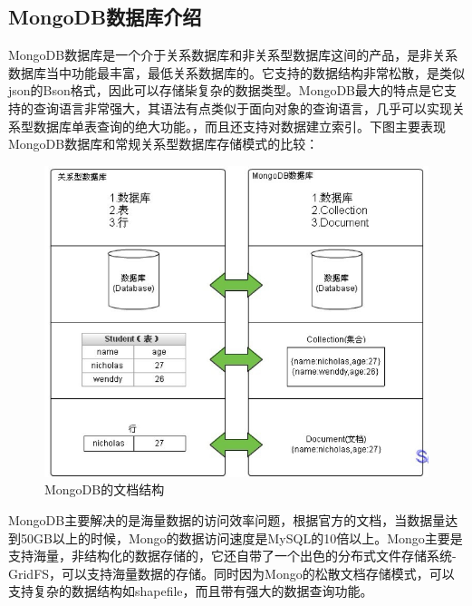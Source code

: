 \documentclass[master]{njnuthesis}
\begin{document}
\subsection{MongoDB数据库介绍}
MongoDB数据库是一个介于关系数据库和非关系型数据库这间的产品，是非关系数据库当中功能最丰富，最低关系数据库的。它支持的数据结构非常松散，是类似json的Bson格式，因此可以存储枈复杂的数据类型。MongoDB最大的特点是它支持的查询语言非常强大，其语法有点类似于面向对象的查询语言，几乎可以实现关系型数据库单表查询的绝大功能。，而且还支持对数据建立索引。下图主要表现MongoDB数据库和常规关系型数据库存储模式的比较：


\begin{figure}[!htb]
\begin{center}
\includegraphics[angle=0,width=1\textwidth]{pic//mongoDB_fileType.jpg}
\caption{MongoDB的文档结构}
\label{fig:1}
\end{center}
\end{figure}

MongoDB主要解决的是海量数据的访问效率问题，根据官方的文档，当数据量达到50GB以上的时候，Mongo的数据访问速度是MySQL的10倍以上。Mongo主要是支持海量，非结构化的数据存储的，它还自带了一个出色的分布式文件存储系统-GridFS，可以支持海量数据的存储。同时因为Mongo的松散文档存储模式，可以支持复杂的数据结构如shapefile，而且带有强大的数据查询功能。
\end{document}
